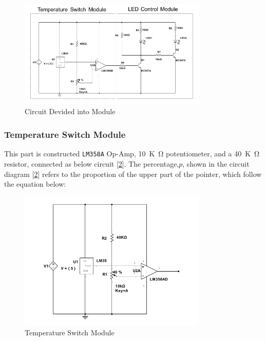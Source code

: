 \documentclass[12pt]{article}
\numberwithin{equation}{section}
\begin{document}
\begin{figure}[H] %
\centering %
\includegraphics[width=0.8\textwidth]{module} %
\caption{Circuit Devided into Module} %
\label{Fig.module} %
\end{figure}








\subsubsection{Temperature Switch Module}

This part is constructed \verb|LM358A| Op-Amp, \qty{10}{K\ohm} potentiometer, and a \qty{40}{K\ohm} resistor, connected as below circuit [\ref{Fig.temp_switch_sensor}]. 
The percentage,$p$, shown in the circuit diagram [\ref{Fig.temp_switch_sensor}] refers to the proportion of the upper part of the pointer, which follow the equation below:


\begin{figure}[H] %
\centering %
\includegraphics[width=0.8\textwidth]{Temperature_Switch_module_origin} %
\caption{Temperature Switch Module} %
\label{Fig.temp_switch_sensor} %
\end{figure}
\end{document}

